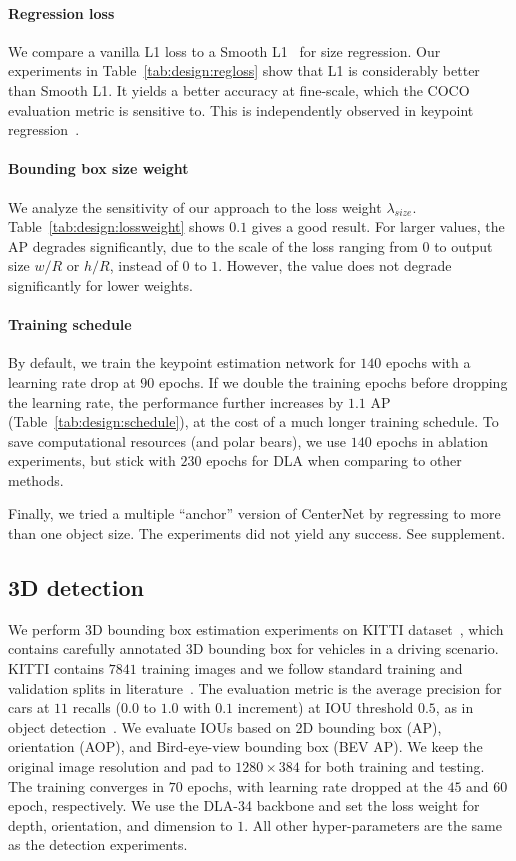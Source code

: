 \documentclass[10pt,twocolumn,letterpaper]{article}
\begin{document}
\paragraph{Regression loss}
We compare a vanilla L1 loss to a Smooth L1~\cite{girshick2015fast} for size regression.
Our experiments in Table~\ref{tab:design:regloss} show that L1 is considerably better than Smooth L1.
It yields a better accuracy at fine-scale, which the COCO evaluation metric is sensitive to.
This is independently observed in keypoint regression~\cite{sun2017compositional,sun2018integral}.

\paragraph{Bounding box size weight}
We analyze the sensitivity of our approach to the loss weight $\lambda_{size}$.
Table~\ref{tab:design:lossweight} shows $0.1$ gives a good result.
For larger values, the AP degrades significantly, due to the scale of the loss ranging from $0$ to output size $w / R$ or $h / R$, instead of $0$ to $1$.
However, the value does not degrade significantly for lower weights.

\paragraph{Training schedule}
By default, we train the keypoint estimation network for $140$ epochs with a learning rate drop at $90$ epochs.
If we double the training epochs before dropping the learning rate, the performance further increases by $1.1$ AP (Table~\ref{tab:design:schedule}), at the cost of a much longer training schedule.
To save computational resources (and polar bears), we use $140$ epochs in ablation experiments, but stick with $230$ epochs for DLA when comparing to other methods.

Finally, we tried a multiple ``anchor'' version of CenterNet by regressing to more than one object size.
The experiments did not yield any success. See supplement.

\subsection{3D detection}

We perform 3D bounding box estimation experiments on KITTI dataset~\cite{Geiger2012CVPR}, which contains carefully annotated 3D bounding box for vehicles in a driving scenario.
KITTI contains $7841$ training images and we follow standard training and validation splits in literature~\cite{xiang2017subcategory,chen20153d}.
The evaluation metric is the average precision for cars at $11$ recalls ($0.0$ to $1.0$ with $0.1$ increment) at IOU threshold $0.5$, as in object detection~\cite{pascal-voc-2012}. 
We evaluate IOUs based on 2D bounding box (AP), orientation (AOP), and Bird-eye-view bounding box (BEV AP).
We keep the original image resolution and pad to $1280 \times 384$ for both training and testing.
The training converges in $70$ epochs, with learning rate dropped at the $45$ and $60$ epoch, respectively.
We use the DLA-34 backbone and set the loss weight for depth, orientation, and dimension to $1$.
All other hyper-parameters are the same as the detection experiments.
\end{document}
